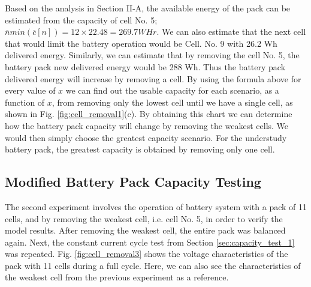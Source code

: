 \documentclass[10pt,twocolumn]{IEEEtran}
\begin{document}
Based on the analysis in Section II-A, the available energy of the pack can be estimated from the capacity of cell No.  5; 
$\overline{n} min(\overline{c}[n]) = 12 \times 22.48 = 269. 7 WHr$.
We can also estimate that the next cell that would limit the battery operation would be Cell. No. 9 with 26.2 Wh delivered energy.
Similarly, we can estimate that by removing the cell No. 5, the battery pack new delivered energy would be 288 Wh.
Thus the battery pack delivered energy will increase by removing a cell.
By using the formula above for every value of $x$ we can find out the usable capacity for each scenario, as a function of $x$, from removing only the lowest cell until we have a single cell, as shown in Fig.  \ref{fig:cell_removal1}(c). 
By obtaining this  chart  we can determine how the battery pack capacity will change by removing the weakest cells. 
We would then simply choose the greatest capacity scenario.
For the understudy battery pack, the greatest capacity is obtained by removing only one cell.



%  


\subsection{Modified  Battery Pack Capacity Testing}
The second  experiment involves the operation of battery system with a pack of 11 cells, and by removing the weakest cell, i.e. cell No. 5, in order to verify the model results. 
After removing the weakest cell, the entire pack was balanced again. Next, the constant current cycle test from Section \ref{sec:capacity_test_1}  was repeated.
Fig.  \ref{fig:cell_removal3} shows the voltage characteristics of the pack with 11 cells during a full cycle.
Here, we can also see the characteristics of the weakest cell from the previous experiment as a reference.
\end{document}
